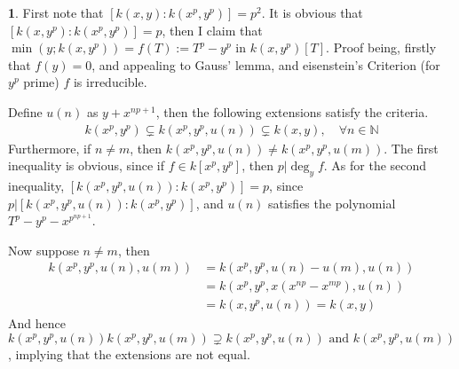\documentclass[11pt]{article}
\theoremstyle{definition}
\newtheorem{pb}{}
\newcommand{\tand}{\text{ and }}
\begin{document}
    \begin{pb}
        First note that \([k(x,y):k(x^p,y^p)] = p^2\). It is obvious that \([k(x,y^p):k(x^p,y^p)] = p\), then I claim that \(\min(y;k(x,y^p)) = f(T) := T^p - y^p\) in
        \(k(x,y^p)[T]\). Proof being, firstly that \(f(y) = 0\), and appealing to Gauss' lemma, and eisenstein's Criterion (for \(y^p\) prime) \(f\) is irreducible.

        Define \(u(n)\) as \(y+x^{np + 1}\), then the following extensions satisfy the criteria.
        \begin{align*}
            k(x^p,y^p) \subsetneq k(x^p,y^p,u(n)) \subsetneq k(x,y), \quad \forall n \in \mathbb{N}
        \end{align*}
        Furthermore, if \(n \neq m\), then \(k(x^p,y^p,u(n)) \neq k(x^p,y^p,u(m))\).
        The first inequality is obvious, since if \(f \in k[x^p,y^p]\), then \(p \vert \deg_yf\). As for the second inequality,
        \([k(x^p,y^p,u(n)):k(x^p,y^p)] = p\), since \(p \vert [k(x^p,y^p,u(n)):k(x^p,y^p)]\), and \(u(n)\) satisfies the polynomial
        \(T^p - y^p - x^{p^{np+1}}\).

        Now suppose \(n \neq m\), then
        \begin{align*}
            k(x^p,y^p,u(n),u(m)) &= k(x^p,y^p,u(n) - u(m),u(n)) \\
            &= k(x^p,y^p, x(x^{np} - x^{mp}), u(n)) \\
            &= k(x,y^p,u(n)) = k(x,y)
        \end{align*}
        And hence \(k(x^p,y^p,u(n))k(x^p,y^p,u(m)) \supsetneq k(x^p,y^p,u(n)) \tand k(x^p,y^p,u(m))\), implying that the extensions are not equal.
    \end{pb}
\end{document}
